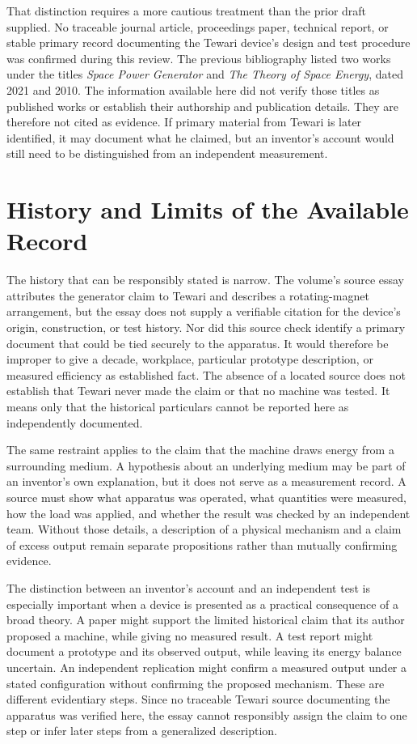 \documentclass[11pt]{article}
\begin{document}
That distinction requires a more cautious treatment than the prior draft supplied. No traceable journal article, proceedings paper, technical report, or stable primary record documenting the Tewari device's design and test procedure was confirmed during this review. The previous bibliography listed two works under the titles \emph{Space Power Generator} and \emph{The Theory of Space Energy}, dated 2021 and 2010. The information available here did not verify those titles as published works or establish their authorship and publication details. They are therefore not cited as evidence. If primary material from Tewari is later identified, it may document what he claimed, but an inventor's account would still need to be distinguished from an independent measurement.

\section{History and Limits of the Available Record}

The history that can be responsibly stated is narrow. The volume's source essay attributes the generator claim to Tewari and describes a rotating-magnet arrangement, but the essay does not supply a verifiable citation for the device's origin, construction, or test history. Nor did this source check identify a primary document that could be tied securely to the apparatus. It would therefore be improper to give a decade, workplace, particular prototype description, or measured efficiency as established fact. The absence of a located source does not establish that Tewari never made the claim or that no machine was tested. It means only that the historical particulars cannot be reported here as independently documented.

The same restraint applies to the claim that the machine draws energy from a surrounding medium. A hypothesis about an underlying medium may be part of an inventor's own explanation, but it does not serve as a measurement record. A source must show what apparatus was operated, what quantities were measured, how the load was applied, and whether the result was checked by an independent team. Without those details, a description of a physical mechanism and a claim of excess output remain separate propositions rather than mutually confirming evidence.

The distinction between an inventor's account and an independent test is especially important when a device is presented as a practical consequence of a broad theory. A paper might support the limited historical claim that its author proposed a machine, while giving no measured result. A test report might document a prototype and its observed output, while leaving its energy balance uncertain. An independent replication might confirm a measured output under a stated configuration without confirming the proposed mechanism. These are different evidentiary steps. Since no traceable Tewari source documenting the apparatus was verified here, the essay cannot responsibly assign the claim to one step or infer later steps from a generalized description.
\end{document}
